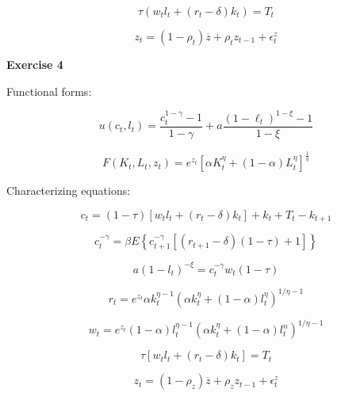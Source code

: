 \documentclass[letterpaper,12pt]{article}
\theoremstyle{definition}
\begin{document}
\begin{equation}
  \tau(w_tl_t+(r_t-\delta)k_t) = T_t
\end{equation}

\begin{equation}
  z_t=(1-\rho_t) \overline{z} +\rho_t z_{t-1} +\epsilon^z_t
\end{equation}

\vspace{3mm}

\noindent\textbf{Exercise 4}

Functional forms:

$$u\left(c_{t}, l_{t}\right)=\frac{c_{t}^{1-\gamma}-1} {1-\gamma}+a\frac{\left(1-\ell_{t}\right)^{1-\xi}-1}{1-\xi}$$

$$F\left(K_{t}, L_{t}, z_{t}\right)=e^{z_{t}}\left[\alpha K_{t}^{\eta}+(1-\alpha) L_{t}^{\eta}\right]^{\frac{1}{\eta}}$$

Characterizing equations:

\begin{equation}
  c_{t}=(1-\tau)\left[w_{t} l_{t}+\left(r_{t}-\delta\right) k_{t}\right]+k_{t}+T_{t}-k_{t+1}
\end{equation}

\begin{equation}
  c_{t}^{-\gamma}=\beta E\left\{c_{t+1}^{-\gamma}\left[\left(r_{t+1}-\delta\right)(1-\tau)+1\right]\right\}
\end{equation}

\begin{equation}
  a\left(1-l_{t}\right)^{-\xi}=c_{t}^{-\gamma} w_{t}(1-\tau)
\end{equation}

\begin{equation}
  r_{t}=e^{z_{t}} \alpha k_{t}^{\eta-1}\left(\alpha k_{t}^{\eta}+(1-\alpha) l_{t}^{\eta}\right)^{{1 / \eta}-1}
\end{equation}

\begin{equation}
  w_{t}=e^{z_{t}}(1-\alpha) l_{t}^{\eta-1}\left(\alpha k_{t}^{\eta}+(1-\alpha) l_{t}^{n}\right)^{{1 / \eta}-1}
\end{equation}

\begin{equation}
  \tau\left[w_{t} l_{t}+\left(r_{t}-\delta\right) k_{t}\right]=T_{t}
\end{equation}

\begin{equation}
  z_{t}=\left(1-\rho_{z}\right) \overline{z}+\rho_{z} z_{t-1}+\epsilon_{t}^{z}
\end{equation}
\end{document}
